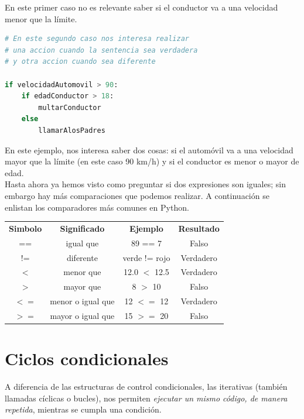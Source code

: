\documentclass[a4paper, openright, 12pt]{article}
\begin{document}
    En este primer caso no es relevante saber si el conductor va a una velocidad menor que la límite.\\

\begin{lstlisting}[language=Python]
# En este segundo caso nos interesa realizar
# una accion cuando la sentencia sea verdadera
# y otra accion cuando sea diferente

if velocidadAutomovil > 90:
    if edadConductor > 18:
        multarConductor
    else
        llamarAlosPadres
\end{lstlisting}

  En este ejemplo, nos interesa saber dos cosas: si el automóvil va a una velocidad mayor que la límite (en este caso 90 km/h) y si el conductor es menor o mayor de edad.\\

  Hasta ahora ya hemos visto como preguntar si dos expresiones son iguales; sin embargo hay más comparaciones que podemos realizar. A continuación se enlistan los comparadores más comunes en Python.\\



\begin{center}
  \begin{tabular}{ |c|c|c|c| }
    \hline
      \textbf{Simbolo}&\textbf{Significado} & \textbf{Ejemplo} & \textbf{Resultado} \\
      ==    & igual que      &    89 == 7       & Falso\\
      !=    & diferente      &    verde != rojo & Verdadero\\
      $<$   & menor que      &    12.0 $<$ 12.5   & Verdadero\\
      $>$   & mayor que      &    8 $>$ 10        & Falso\\
      $<=$  & menor o igual que & 12 $<=$ 12      & Verdadero\\
      $>=$  & mayor o igual que & 15 $>=$ 20      & Falso\\
    \hline
  \end{tabular}
\end{center}

    \newpage{}


  \section{Ciclos condicionales}
    A diferencia de las estructuras de control condicionales, las iterativas (también llamadas cíclicas o bucles), nos permiten \textit{ejecutar un mismo código, de manera repetida}, mientras se cumpla una condición.\\
\end{document}
